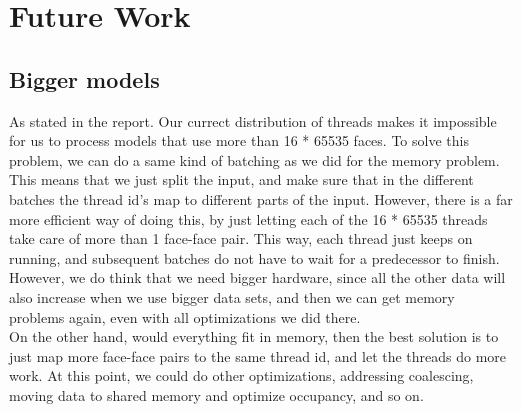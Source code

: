 \section{Future Work}
\subsection{Bigger models}
As stated in the report. Our currect distribution of threads makes it impossible for us to process models that use more than 16 * 65535 faces. To solve this problem, we can do a same kind of batching as we did for the memory problem. This means that we just split the input, and make sure that in the different batches the thread id's map to different parts of the input. However, there is a far more efficient way of doing this, by just letting each of the 16 * 65535 threads take care of more than 1 face-face pair. This way, each thread just keeps on running, and subsequent batches do not have to wait for a predecessor to finish. However, we do think that we need bigger hardware, since all the other data will also increase when we use bigger data sets, and then we can get memory problems again, even with all optimizations we did there. \\

On the other hand, would everything fit in memory, then the best solution is to just map more face-face pairs to the same thread id, and let the threads do more work. At this point, we could do other optimizations, addressing coalescing, moving data to shared memory and optimize occupancy, and so on.